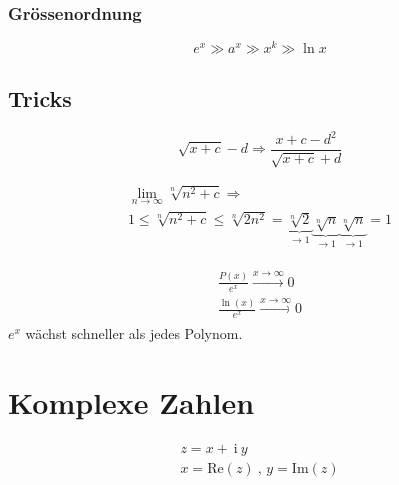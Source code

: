 \documentclass[12pt]{article}
\newcommand{\ci}{\:\mathrm{i}\:}
\begin{document}
\begin{multicols*}{3}
				\subsubsection{Grössenordnung} %
					\[
						e^x \gg a^x \gg x^k \gg \ln x
					\]
				
			\subsection{Tricks} %
				\[
					\sqrt{x+c} - d \Rightarrow \frac{x+c-d^2}{\sqrt{x+c}+d}
				\]
				
				\begin{gather*}
					\lim_{n \to \infty} \sqrt[n]{n^2+c} \Rightarrow \\
					1 \leq \sqrt[n]{n^2+c} \leq \sqrt[n]{2n^2} = \underbrace{\sqrt[n]{2}}_{\to 1} \underbrace{\sqrt[n]{n}}_{\to 1} \underbrace{\sqrt[n]{n}}_{\to 1} = 1
				\end{gather*}
				
				\begin{gather*}
					\begin{array}{l}
						\frac{P(x)}{e^x} \stackrel{x \to \infty}{\longrightarrow} 0 \\
						\frac{\ln(x)}{e^x} \stackrel{x \to \infty}{\longrightarrow} 0
					\end{array}
				\end{gather*}
				$e^x$ wächst schneller als jedes Polynom.
		\section{Komplexe Zahlen} %
			\begin{gather*}
				z = x + \ci y \\
				x = \mathrm{Re}(z)\ ,\, y = \mathrm{Im}(z)
			\end{gather*}
			

\end{multicols*}
\end{document}
